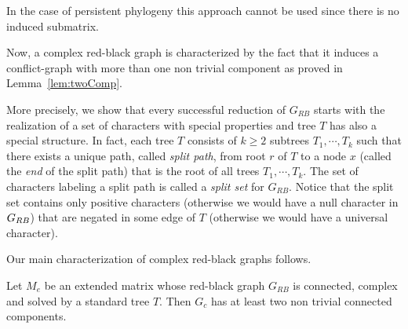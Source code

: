 In the case of persistent phylogeny this approach cannot be used since there is no induced submatrix.

Now, a complex red-black graph is characterized by the fact that it induces a
conflict-graph with more than one non trivial component as proved in
Lemma~\ref{lem:twoComp}.

More precisely,  we show that every successful
reduction of  $G_{RB}$ starts with the realization of a set of
characters with special properties and tree $T$ has also a special structure.
In fact, each tree $T$ consists of  $k \geq 2$ subtrees $T_1, \cdots, T_k$
such that there exists a unique path, called \emph{split path}, from root $r$
of $T$ to a node $x$ (called the \emph{end} of the split path)
that is  the root of all  trees $T_1, \cdots, T_k$.
The set of characters labeling a split path is called a {\em split set} for
$G_{RB}$.
Notice that the split set contains only positive characters (otherwise we would
have a null
character in $G_{RB}$) that are negated in some edge of $T$ (otherwise we would
have a universal character).

Our main characterization of complex red-black graphs follows.

\begin{lemma}
  \label{lem:twoComp}
Let $M_e$ be an extended matrix whose red-black graph  $G_{RB}$
is connected, complex and solved by a standard tree $T$.
Then $G_{c}$ has  at least two non trivial
connected components.

\end{lemma}


